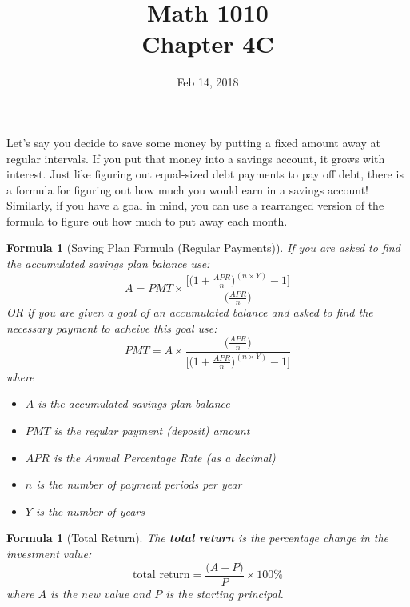 \documentclass[12pt]{article}
\newtheorem{formula}[theorem]{Formula}
\begin{document}
\title{\bf Math 1010 \\ Chapter 4C\iftoggle{sol}{ Key}{} }
\date{\vspace{-0.5in}Feb 14, 2018}
\maketitle


\renewcommand{\theenumi}{\alph{enumi}}
\renewcommand{\labelenumi}{(\theenumi)}
Let's say you decide to save some money by putting a fixed amount away at regular intervals. 
If you put that money into a savings account, it grows with interest. Just like figuring out equal-sized debt payments to pay off debt, there is a formula for figuring out how much you would earn in a savings account! 
Similarly, if you have a goal in mind, you can use a rearranged version of the formula to figure out how much to put away each month.

\begin{formula}[Saving Plan Formula (Regular Payments)]
If you are asked to find the accumulated savings plan balance use:
	\begin{equation}\label{eq:savings_plan_regular}
		A = PMT \times \frac{\Big[\Big(1 + \frac{APR}{n}\Big)^{(n\times Y)} - 1\Big]}{\Big(\frac{APR}{n}\Big)}
	\end{equation}
	OR if you are given a goal of an accumulated balance and asked to find the necessary payment to acheive this goal use:
	\begin{equation}\label{eq:savings_plan_regular_pmt}
		PMT = A \times \frac{\Big(\frac{APR}{n}\Big)}{\Big[\Big(1 + \frac{APR}{n}\Big)^{(n\times Y)} - 1\Big]}
	\end{equation}
	where
	\begin{itemize}
		\item $A$ is the accumulated savings plan balance
		\item $PMT$ is the regular payment (deposit) amount
		\item $APR$ is the Annual Percentage Rate  (as a decimal)
		\item $n$ is the number of payment periods per year
		\item $Y$ is the number of years
	\end{itemize}
\end{formula}

\begin{formula}[Total Return]
	The {\bf total return} is the percentage change in the investment value:
	\begin{equation}\label{eq:total}
		\text{total return} = \frac{\Big(A-P\Big)}{P}\times 100\%
	\end{equation}
	where $A$ is the new value and $P$ is the starting principal.
\end{formula}
\end{document}
